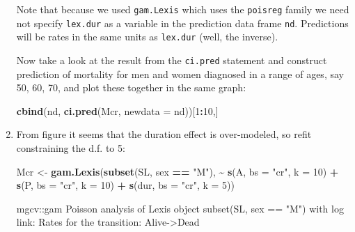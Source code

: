 \documentclass[
]{book}
\newenvironment{Shaded}{\begin{snugshade}}{\end{snugshade}}
\newcommand{\AttributeTok}[1]{\textcolor[rgb]{0.13,0.29,0.53}{#1}}
\newcommand{\DecValTok}[1]{\textcolor[rgb]{0.00,0.00,0.81}{#1}}
\newcommand{\FunctionTok}[1]{\textcolor[rgb]{0.13,0.29,0.53}{\textbf{#1}}}
\newcommand{\NormalTok}[1]{#1}
\newcommand{\OtherTok}[1]{\textcolor[rgb]{0.56,0.35,0.01}{#1}}
\newcommand{\SpecialCharTok}[1]{\textcolor[rgb]{0.81,0.36,0.00}{\textbf{#1}}}
\newcommand{\StringTok}[1]{\textcolor[rgb]{0.31,0.60,0.02}{#1}}
\begin{document}
\begin{enumerate}
  Note that because we used \texttt{gam.Lexis} which uses
  the \texttt{poisreg} family we need not specify \texttt{lex.dur} as a
  variable in the prediction data frame \texttt{nd}. Predictions will
  be rates in the same units as \texttt{lex.dur} (well, the inverse).

  Now take a look at the result from the \texttt{ci.pred} statement and
  construct prediction of mortality for men and women diagnosed in a
  range of ages, say 50, 60, 70, and plot these together in the same
  graph:

\begin{Shaded}
\begin{Highlighting}[]
\FunctionTok{cbind}\NormalTok{(nd, }\FunctionTok{ci.pred}\NormalTok{(Mcr, }\AttributeTok{newdata =}\NormalTok{ nd))[}\DecValTok{1}\SpecialCharTok{:}\DecValTok{10}\NormalTok{,]}
\end{Highlighting}
\end{Shaded}
\item
  From figure it seems that the duration effect is
  over-modeled, so refit constraining the d.f. to 5:

\begin{Shaded}
\begin{Highlighting}[]
\NormalTok{Mcr }\OtherTok{\textless{}{-}} \FunctionTok{gam.Lexis}\NormalTok{(}\FunctionTok{subset}\NormalTok{(SL, sex }\SpecialCharTok{==} \StringTok{"M"}\NormalTok{),}
                 \SpecialCharTok{\textasciitilde{}} \FunctionTok{s}\NormalTok{(A, }\AttributeTok{bs =} \StringTok{"cr"}\NormalTok{, }\AttributeTok{k =} \DecValTok{10}\NormalTok{) }\SpecialCharTok{+}
                   \FunctionTok{s}\NormalTok{(P, }\AttributeTok{bs =} \StringTok{"cr"}\NormalTok{, }\AttributeTok{k =} \DecValTok{10}\NormalTok{) }\SpecialCharTok{+}
                 \FunctionTok{s}\NormalTok{(dur, }\AttributeTok{bs =} \StringTok{"cr"}\NormalTok{, }\AttributeTok{k =} \DecValTok{5}\NormalTok{))}
\end{Highlighting}
\end{Shaded}

\begin{Shaded}
\begin{Highlighting}[]
\NormalTok{mgcv::gam Poisson analysis of Lexis object subset(SL, sex == "M") with log link:}
\NormalTok{Rates for the transition:}
\NormalTok{Alive{-}\textgreater{}Dead}
\end{Highlighting}
\end{Shaded}


\end{enumerate}
\end{document}
